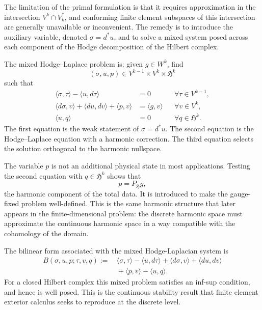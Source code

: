 \documentclass{article}
\newcommand{\f}[1]{\mathfrak{#1}}
\begin{document}
The limitation of the primal formulation is that it requires approximation in the intersection
$V^k\cap V_k^*$, and conforming finite element subspaces of this intersection
are generally unavailable or inconvenient.  The remedy is to introduce the
auxiliary variable, denoted $\sigma
	=
	d^*u$, and to solve a mixed system posed across each component of the Hodge decomposition of the Hilbert complex.

The mixed Hodge--Laplace problem is: given $g\in W^k$, find
\[
	(\sigma,u,p)
	\in
	V^{k-1}\times V^k\times \f H^k
\]
such that
\begin{equation}\label{eqn:mixed-hodge-laplacian}
\begin{array}{rlrr}
	\langle \sigma,\tau\rangle
	-
	\langle u,d\tau\rangle
	&=
	0
	&&
	\forall \tau\in V^{k-1},
	\\
	\langle d\sigma,v\rangle
	+
	\langle du,dv\rangle
	+
	\langle p,v\rangle
	&=
	\langle g,v\rangle
	&&
	\forall v\in V^k,
	\\
	\langle u,q\rangle
	&=
	0
	&&
	\forall q\in \f H^k.
    \end{array}
	\end{equation}
The first equation is the weak statement of $\sigma=d^*u$.  The second equation
is the Hodge--Laplace equation with a harmonic correction.  The third equation
selects the solution orthogonal to the harmonic nullspace.

The variable $p$ is not an additional physical state in most applications. Testing the second equation with $q\in\f H^k$ shows that
\[
  p=P_{\f H}g,
\]
the harmonic component of the total data. It is introduced to make the gauge-fixed problem well-defined. This is the same harmonic structure that later appears in the finite-dimensional problem: the discrete harmonic space must approximate the continuous harmonic space in a way compatible with the cohomology of the domain.

The bilinear form associated with the mixed Hodge-Laplacian system is
\begin{align*}
	B(\sigma,u,p;\tau,v,q)
	:=
	&\,
	\langle \sigma,\tau\rangle
	-
	\langle u,d\tau\rangle
	+
	\langle d\sigma,v\rangle
	+
	\langle du,dv\rangle
	\\
	&\,
	+
	\langle p,v\rangle
	-
	\langle u,q\rangle .
\end{align*}
For a closed Hilbert complex this mixed problem satisfies an inf-sup condition,
and hence is well posed.  This is the continuous stability result that finite
element exterior calculus seeks to reproduce at the discrete level.
\end{document}
